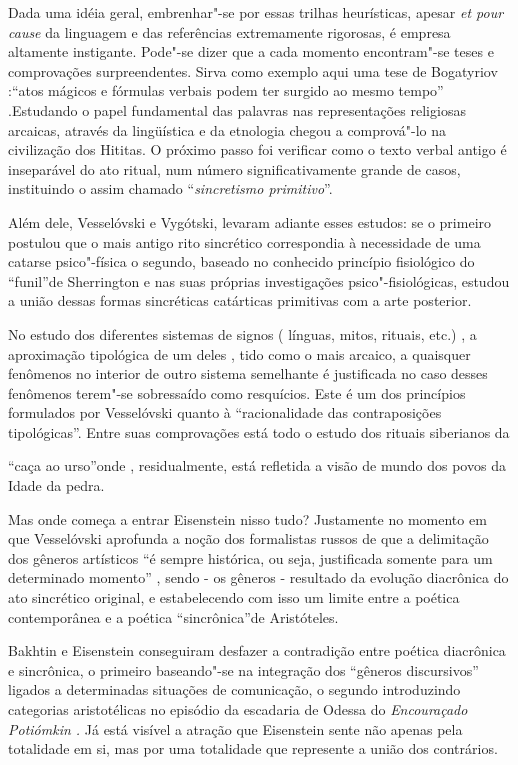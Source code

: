 Dada uma idéia geral, embrenhar"-se por essas trilhas heurísticas, apesar
\emph{et pour cause} da linguagem e das referências extremamente
rigorosas, é empresa altamente instigante. Pode"-se dizer que a cada
momento encontram"-se teses e comprovações surpreendentes. Sirva como
exemplo aqui uma tese de Bogatyriov :``atos mágicos e fórmulas verbais
podem ter surgido ao mesmo tempo'' .Estudando o papel fundamental das
palavras nas representações religiosas arcaicas, através da lingüística
e da etnologia chegou a comprová"-lo na civilização dos Hititas. O
próximo passo foi verificar como o texto verbal antigo é inseparável do
ato ritual, num número significativamente grande de casos, instituindo o
assim chamado ``\emph{sincretismo primitivo}''.

Além dele, Vesselóvski e Vygótski, levaram adiante esses estudos: se o
primeiro postulou que o mais antigo rito sincrético correspondia à
necessidade de uma catarse psico"-física o segundo, baseado no conhecido
princípio fisiológico do ``funil''de Sherrington e nas suas próprias
investigações psico"-fisiológicas, estudou a união dessas formas
sincréticas catárticas primitivas com a arte posterior.

No estudo dos diferentes sistemas de signos ( línguas, mitos, rituais,
etc.) , a aproximação tipológica de um deles , tido como o mais arcaico,
a quaisquer fenômenos no interior de outro sistema semelhante é
justificada no caso desses fenômenos terem"-se sobressaído como
resquícios. Este é um dos princípios formulados por Vesselóvski quanto à
``racionalidade das contraposições tipológicas''. Entre suas
comprovações está todo o estudo dos rituais siberianos da

``caça ao urso''onde , residualmente, está refletida a visão de mundo
dos povos da Idade da pedra.

Mas onde começa a entrar Eisenstein nisso tudo? Justamente no momento em
que Vesselóvski aprofunda a noção dos formalistas russos de que a
delimitação dos gêneros artísticos ``é sempre histórica, ou seja,
justificada somente para um determinado momento'' , sendo - os gêneros -
resultado da evolução diacrônica do ato sincrético original, e
estabelecendo com isso um limite entre a poética contemporânea e a
poética ``sincrônica''de Aristóteles.

Bakhtin e Eisenstein conseguiram desfazer a contradição entre poética
diacrônica e sincrônica, o primeiro baseando"-se na integração dos
``gêneros discursivos'' ligados a determinadas situações de comunicação,
o segundo introduzindo categorias aristotélicas no episódio da escadaria
de Odessa do \emph{Encouraçado Potiómkin .} Já está visível a atração
que Eisenstein sente não apenas pela totalidade em si, mas por uma
totalidade que represente a união dos contrários.

